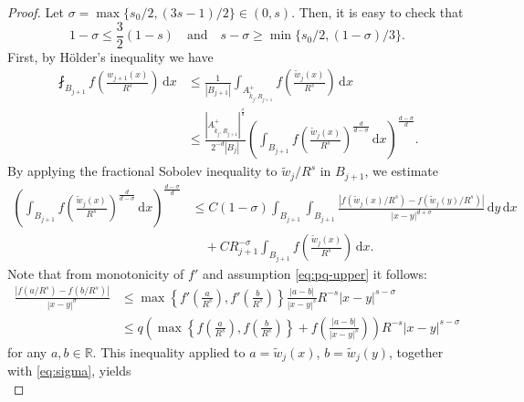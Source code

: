 \documentclass[11pt]{amsart}
\theoremstyle{plain}
\theoremstyle{definition}
\numberwithin{equation}{section}
\newcommand{\dx} {\,\mathrm{d}x}
\newcommand{\dy} {\,\mathrm{d}y}
\begin{document}
\begin{proof}
Let $\sigma = \max \lbrace s_0/2, (3s-1)/2 \rbrace \in (0, s)$. Then, it is easy to check that
\begin{equation} \label{eq:sigma}
1-\sigma \leq \frac{3}{2}(1-s) \quad\text{and}\quad s-\sigma \geq \min\lbrace s_0/2, (1-\sigma)/3 \rbrace.
\end{equation}
First, by H\"older's inequality we have
\begin{equation*}
\begin{split}
\fint_{B_{j+1}} f\left( \frac{w_{j+1}(x)}{R^s} \right) \dx
&\leq \frac{1}{|B_{j+1}|} \int_{A_{\tilde{k}_j, R_{j+1}}^+} f\left(\frac{\tilde{w}_j(x)}{R^s}\right) \dx \\
&\leq \frac{|A_{\tilde{k}_j, R_{j+1}}^+|^{\frac{\sigma}{d}}}{2^{-d} |B_j|} \left( \int_{B_{j+1}} f \left( \frac{\tilde{w}_j(x)}{R^s} \right)^{\frac{d}{d-\sigma}} \dx \right)^{\frac{d-\sigma}{d}}.
\end{split}
\end{equation*}
By applying the fractional Sobolev inequality to $\tilde{w}_j/R^s$ in $B_{j+1}$, we estimate
\begin{equation*}
\begin{split}
\left( \int_{B_{j+1}} f \left( \frac{\tilde{w}_j(x)}{R^s} \right)^{\frac{d}{d-\sigma}} \dx \right)^{\frac{d-\sigma}{d}} 
&\leq C (1-\sigma) \int_{B_{j+1}} \int_{B_{j+1}} \frac{|f(\tilde{w}_j(x)/R^s) - f(\tilde{w}_j(y)/R^s)|}{|x-y|^{d+\sigma}} \dy \dx \\
&\quad + C R_{j+1}^{-\sigma} \int_{B_{j+1}} f\left( \frac{\tilde{w}_j(x)}{R^s} \right) \dx.
\end{split}
\end{equation*}
Note that from monotonicity of $f'$ and assumption \eqref{eq:pq-upper} it follows:
\begin{equation*}
\begin{split}
\frac{|f(a/R^s)-f(b/R^s)|}{|x-y|^{\sigma}}
&\leq \max \left\lbrace f'\left( \frac{a}{R^s}\right), f'\left( \frac{b}{R^s}\right) \right\rbrace \frac{|a-b|}{|x-y|^s} R^{-s} |x-y|^{s-\sigma} \\ 
&\leq q \left( \max \left\lbrace f\left( \frac{a}{R^s}\right), f\left( \frac{b}{R^s}\right) \right\rbrace + f\left( \frac{|a-b|}{|x-y|^s} \right) \right) R^{-s} |x-y|^{s-\sigma}
\end{split}
\end{equation*}
for any $a, b \in \mathbb{R}$. This inequality applied to $a=\tilde{w}_j(x)$, $b=\tilde{w}_j(y)$, together with \eqref{eq:sigma}, yields
\begin{equation*}

\end{equation*}
\end{proof}
\end{document}
